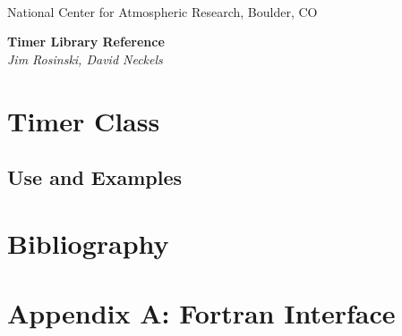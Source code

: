 \documentclass[]{article}
\begin{document}

\begin{titlepage}

\begin{latexonly}
 \\
\noindent National Center for Atmospheric Research, Boulder, CO \\
\vspace{2in}
\end{latexonly}

\begin{center}
{\Large\bf Timer Library Reference} \\
{\it Jim Rosinski, David Neckels}
\end{center}

\end{titlepage}

\tableofcontents

\newpage


%

\newpage
\section{Timer Class}



\subsection{Use and Examples}




\section{Bibliography}
 


\setcounter{section}{1}

\section*{Appendix A:  Fortran Interface}


\end{document}
